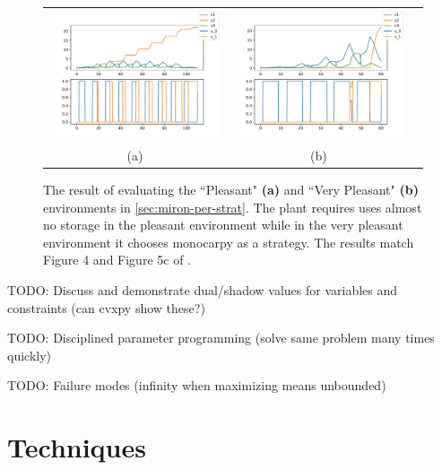 \documentclass{article}
\begin{document}
\begin{figure}
  \centering
  \begin{tabular}{ccc}
    \includegraphics[width=3in]{imgs/MironchenkoFigure5e.pdf} &
    \includegraphics[width=3in]{imgs/Mironchenko_figure4.pdf} \\
    (a) & (b)
  \end{tabular}
  \caption{The result of evaluating the ``Pleasant" \textbf{(a)} and ``Very Pleasant" \textbf{(b)} environments in \autoref{sec:miron-per-strat}. The plant requires uses almost no storage in the pleasant environment while in the very pleasant environment it chooses monocarpy as a strategy. The results match Figure 4 and Figure 5c of \citep{mironchenko_optimal_2014}.\label{fig:mironchenko-fig4and5c}}
\end{figure}



TODO: Discuss and demonstrate dual/shadow values for variables and constraints (can cvxpy show these?)

TODO: Disciplined parameter programming (solve same problem many times quickly)

TODO: Failure modes (infinity when maximizing means unbounded)




\section{Techniques}
\label{sec:techniques}
\end{document}
